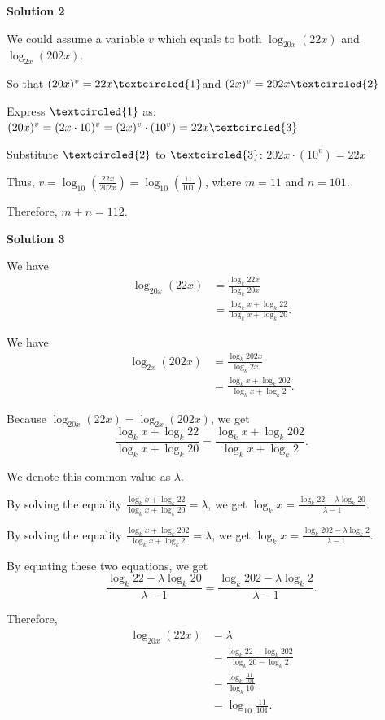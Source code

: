 \begin{enumerate}
\textbf{Solution 2}

We could assume a variable $v$ which equals to both $\log_{20x} (22x)$ and $\log_{2x} (202x)$.

 So that $(20x)^v=22x \textcircled{1}$and $(2x)^v=202x \textcircled{2}$

 Express $\textcircled{1}$ as: $(20x)^v=(2x \cdot 10)^v=(2x)^v \cdot \left(10^v\right)=22x \textcircled{3}$

 Substitute $\textcircled{{2}}$ to $\textcircled{3}$: $202x \cdot (10^v)=22x$

 Thus, $v=\log_{10} \left(\frac{22x}{202x}\right)= \log_{10} \left(\frac{11}{101}\right)$, where $m=11$ and $n=101$.

 Therefore, $m+n = \boxed{112}$.

 



\textbf{Solution 3}

We have
 \begin{align*} \log_{20x} (22x) & = \frac{\log_k 22x}{\log_k 20x} \\ & = \frac{\log_k x + \log_k 22}{\log_k x + \log_k 20} . \end{align*}


 We have
 \begin{align*} \log_{2x} (202x) & = \frac{\log_k 202x}{\log_k 2x} \\ & = \frac{\log_k x + \log_k 202 }{\log_k x + \log_k 2} . \end{align*}


 Because $\log_{20x} (22x)=\log_{2x} (202x)$, we get
 \[ \frac{\log_k x + \log_k 22}{\log_k x + \log_k 20} = \frac{\log_k x + \log_k 202 }{\log_k x + \log_k 2} . \]

 We denote this common value as $\lambda$.

 By solving the equality $\frac{\log_k x + \log_k 22}{\log_k x + \log_k 20} = \lambda$, we get $\log_k x = \frac{\log_k 22 - \lambda \log_k 20}{\lambda - 1}$.

 By solving the equality $\frac{\log_k x + \log_k 202 }{\log_k x + \log_k 2} = \lambda$, we get $\log_k x = \frac{\log_k 202 - \lambda \log_k 2}{\lambda - 1}$.

 By equating these two equations, we get
 \[ \frac{\log_k 22 - \lambda \log_k 20}{\lambda - 1} = \frac{\log_k 202 - \lambda \log_k 2}{\lambda - 1} . \]

 Therefore,
 \begin{align*} \log_{20x} (22x) & = \lambda \\ & = \frac{\log_k 22 - \log_k 202}{\log_k 20 - \log_k 2} \\ & = \frac{\log_k \frac{11}{101}}{\log_k 10} \\ & = \log_{10} \frac{11}{101} . \end{align*}



\end{enumerate}
